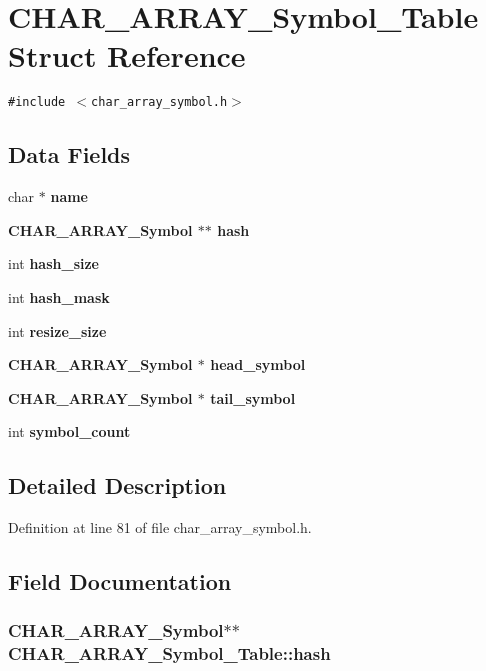 \section{CHAR\_\-ARRAY\_\-Symbol\_\-Table Struct Reference}
\label{structCHAR__ARRAY__Symbol__Table}
{\tt \#include $<$char\_\-array\_\-symbol.h$>$}

\subsection*{Data Fields}
\begin{CompactItemize}
\item 
char $\ast$ \bf{name}
\item 
\bf{CHAR\_\-ARRAY\_\-Symbol} $\ast$$\ast$ \bf{hash}
\item 
int \bf{hash\_\-size}
\item 
int \bf{hash\_\-mask}
\item 
int \bf{resize\_\-size}
\item 
\bf{CHAR\_\-ARRAY\_\-Symbol} $\ast$ \bf{head\_\-symbol}
\item 
\bf{CHAR\_\-ARRAY\_\-Symbol} $\ast$ \bf{tail\_\-symbol}
\item 
int \bf{symbol\_\-count}
\end{CompactItemize}


\subsection{Detailed Description}




Definition at line 81 of file char\_\-array\_\-symbol.h.

\subsection{Field Documentation}
\subsubsection{\setlength{\rightskip}{0pt plus 5cm}\bf{CHAR\_\-ARRAY\_\-Symbol}$\ast$$\ast$ \bf{CHAR\_\-ARRAY\_\-Symbol\_\-Table::hash}}\label{structCHAR__ARRAY__Symbol__Table_94bb4ce8e0c9c6d87ee112944ec5be02}




